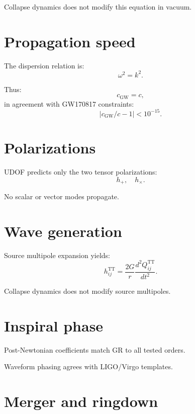 \documentclass[11pt]{book}
\begin{document}
Collapse dynamics does not modify this equation in vacuum.

\section{Propagation speed}

The dispersion relation is:
\begin{equation}
\omega^2 = k^2.
\end{equation}

Thus:
\begin{equation}
c_{\mathrm{GW}} = c,
\end{equation}
in agreement with GW170817 constraints:
\begin{equation}
|c_{\mathrm{GW}}/c - 1| < 10^{-15}.
\end{equation}

\section{Polarizations}

UDOF predicts only the two tensor polarizations:
\begin{equation}
h_+, \quad h_\times.
\end{equation}

No scalar or vector modes propagate.

\section{Wave generation}

Source multipole expansion yields:
\begin{equation}
h_{ij}^{\mathrm{TT}}
=
\frac{2G}{r}
\frac{d^2 Q_{ij}^{\mathrm{TT}}}{dt^2}.
\end{equation}

Collapse dynamics does not modify source multipoles.

\section{Inspiral phase}

Post-Newtonian coefficients match GR to all tested orders.

Waveform phasing agrees with LIGO/Virgo templates.

\section{Merger and ringdown}
\end{document}
